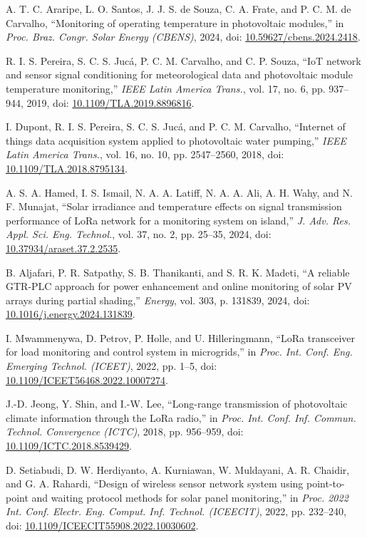 \documentclass{ieeeaccess}
\begin{document}
\begin{thebibliography}{00}
A. T. C. Araripe, L. O. Santos, J. J. S. de Souza, C. A. Frate, and P. C. M. de Carvalho, “Monitoring of operating temperature in photovoltaic modules,” in \emph{Proc. Braz. Congr. Solar Energy (CBENS)}, 2024, doi: \url{10.59627/cbens.2024.2418}.

R. I. S. Pereira, S. C. S. Jucá, P. C. M. Carvalho, and C. P. Souza, “IoT network and sensor signal conditioning for meteorological data and photovoltaic module temperature monitoring,” \emph{IEEE Latin America Trans.}, vol. 17, no. 6, pp. 937–944, 2019, doi: \url{10.1109/TLA.2019.8896816}.

I. Dupont, R. I. S. Pereira, S. C. S. Jucá, and P. C. M. Carvalho, “Internet of things data acquisition system applied to photovoltaic water pumping,” \emph{IEEE Latin America Trans.}, vol. 16, no. 10, pp. 2547–2560, 2018, doi: \url{10.1109/TLA.2018.8795134}.

A. S. A. Hamed, I. S. Ismail, N. A. A. Latiff, N. A. A. Ali, A. H. Wahy, and N. F. Munajat, “Solar irradiance and temperature effects on signal transmission performance of LoRa network for a monitoring system on island,” \emph{J. Adv. Res. Appl. Sci. Eng. Technol.}, vol. 37, no. 2, pp. 25–35, 2024, doi: \url{10.37934/araset.37.2.2535}.

B. Aljafari, P. R. Satpathy, S. B. Thanikanti, and S. R. K. Madeti, “A reliable GTR-PLC approach for power enhancement and online monitoring of solar PV arrays during partial shading,” \emph{Energy}, vol. 303, p. 131839, 2024, doi: \url{10.1016/j.energy.2024.131839}.

I. Mwammenywa, D. Petrov, P. Holle, and U. Hilleringmann, “LoRa transceiver for load monitoring and control system in microgrids,” in \emph{Proc. Int. Conf. Eng. Emerging Technol. (ICEET)}, 2022, pp. 1–5, doi: \url{10.1109/ICEET56468.2022.10007274}.

J.-D. Jeong, Y. Shin, and I.-W. Lee, “Long-range transmission of photovoltaic climate information through the LoRa radio,” in \emph{Proc. Int. Conf. Inf. Commun. Technol. Convergence (ICTC)}, 2018, pp. 956–959, doi: \url{10.1109/ICTC.2018.8539429}.

D. Setiabudi, D. W. Herdiyanto, A. Kurniawan, W. Muldayani, A. R. Chaidir, and G. A. Rahardi, “Design of wireless sensor network system using point-to-point and waiting protocol methods for solar panel monitoring,” in \emph{Proc. 2022 Int. Conf. Electr. Eng. Comput. Inf. Technol. (ICEECIT)}, 2022, pp. 232–240, doi: \url{10.1109/ICEECIT55908.2022.10030602}.


\end{thebibliography}
\end{document}

